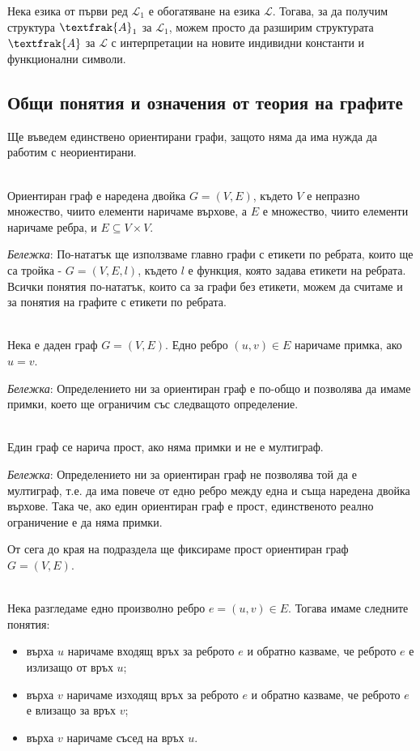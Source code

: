 \documentclass[12pt,twoside,a4paper]{article}
\begin{document}
	Нека езика от първи ред $\mathcal{L}_1$ е обогатяване на езика $\mathcal{L}$. Тогава, за да получим структура $\textfrak{A}_1$ за $\mathcal{L}_1$, можем просто да разширим структурата $\textfrak{A}$ за $\mathcal{L}$ с интерпретации на новите индивидни константи и функционални символи.
	
	\subsection{Общи понятия и означения от теория на графите}
	Ще въведем единствено ориентирани графи, защото няма да има нужда да работим с неориентирани.
	\begin{definition}~\\
		\indent Ориентиран граф е наредена двойка $G=(V,E)$, където $V$ е непразно множество, чиито елементи наричаме върхове, а $E$ е множество, чиито елементи наричаме ребра, и $E \subseteq V \times V$.
		
		\textit{Бележка}: По-нататък ще използваме главно графи с етикети по ребрата, които ще са тройка - $G=(V,E,l)$, където $l$ е функция, която задава етикети на ребрата. Всички понятия по-нататък, които са за графи без етикети, можем да считаме и за понятия на графите с етикети по ребрата.
	\end{definition}
	
	\begin{definition}[примка]~\\
		\indent Нека е даден граф $G=(V,E)$. Едно ребро $(u,v) \in E$ наричаме примка, ако $u=v$.
		
		\textit{Бележка}: Определението ни за ориентиран граф е по-общо и позволява да имаме примки, което ще ограничим със следващото определение.
	\end{definition}
	
	\begin{definition}~\\
		\indent Един граф се нарича прост, ако няма примки и не е мултиграф.
		
		\textit{Бележка}: Определението ни за ориентиран граф не позволява той да е мултиграф, т.е. да има повече от едно ребро между една и съща наредена двойка върхове. Така че, ако един ориентиран граф е прост, единственото реално ограничение е да няма примки.
	\end{definition}
	
	От сега до края на подраздела ще фиксираме прост ориентиран граф $G=(V,E)$.
	\begin{definitions}~\\
		\indent Нека разгледаме едно произволно ребро $e = (u,v) \in E$. Тогава имаме следните понятия:
		\begin{itemize}
			\item върха $u$ наричаме входящ връх за реброто $e$ и обратно казваме, че реброто $e$ е излизащо от връх $u$;
			\item върха $v$ наричаме изходящ връх за реброто $e$ и обратно казваме, че реброто $e$ е влизащо за връх $v$;
			\item върха $v$ наричаме съсед на връх $u$.
		\end{itemize}
	\end{definitions}
	
\end{document}
